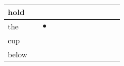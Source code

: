 \documentclass[landscape]{article}
\newcommand{\ssp}{\hspace{2pt}}
\newcommand{\mex}{\cellcolor{g}$\bullet$}
\begin{document}
\begin{tabular}{|l|p{10pt}|p{10pt}|p{10pt}|p{10pt}|p{10pt}|p{10pt}|p{10pt}|p{10pt}|p{10pt}|p{10pt}|p{10pt}|}
\hline
\ssp hold \ssp&\hspace{2pt}&\hspace{2pt}&\hspace{2pt}&\hspace{2pt}&\hspace{2pt}&\hspace{2pt}&\hspace{2pt}&\hspace{2pt}&\hspace{2pt}&\hspace{2pt}&\hspace{2pt}\\
\hline
\ssp \cellcolor{ref1}the \ssp&\hspace{2pt}&\hspace{2pt}\mex&\hspace{2pt}&\hspace{2pt}&\hspace{2pt}&\hspace{2pt}&\hspace{2pt}&\hspace{2pt}&\hspace{2pt}&\hspace{2pt}&\hspace{2pt}\\
\hline
\ssp cup \ssp&\hspace{2pt}&\hspace{2pt}&\hspace{2pt}&\hspace{2pt}&\hspace{2pt}&\hspace{2pt}&\hspace{2pt}&\hspace{2pt}&\hspace{2pt}&\hspace{2pt}&\hspace{2pt}\\
\hline
\ssp below \ssp&\hspace{2pt}&\hspace{2pt}&\hspace{2pt}&\hspace{2pt}&\hspace{2pt}&\hspace{2pt}&\hspace{2pt}&\hspace{2pt}&\hspace{2pt}&\hspace{2pt}&\hspace{2pt}\\

\end{tabular}
\end{document}
